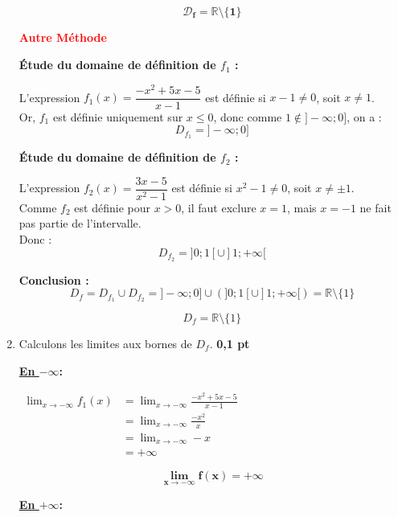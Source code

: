 \documentclass[12pt,a4paper]{article}
\begin{document}
\begin{enumerate}
    \begin{resultbox}
    \[
    \mathbf{\mathcal{D}_f = \mathbb{R} \setminus \{1\}}
    \]
		\end{resultbox}

\textcolor{red}{\textbf{Autre Méthode}}		

    \textbf{Étude du domaine de définition de \( f_1 \) :}

    L'expression \( f_1(x) = \dfrac{-x^2 + 5x - 5}{x - 1} \) est définie si \( x - 1 \neq 0 \), soit \( x \neq 1 \).\\
    Or, \( f_1 \) est définie uniquement sur \( x \leq 0 \), donc comme \( 1 \notin ]-\infty ; 0] \), on a :
    \[
    D_{f_1} = ]-\infty ; 0]
    \]

    \textbf{Étude du domaine de définition de \( f_2 \) :}

    L'expression \( f_2(x) = \dfrac{3x - 5}{x^2 - 1} \) est définie si \( x^2 - 1 \neq 0 \), soit \( x \neq \pm 1 \).\\
    Comme \( f_2 \) est définie pour \( x > 0 \), il faut exclure \( x = 1 \), mais \( x = -1 \) ne fait pas partie de l'intervalle.\\
    Donc :
    \[
    D_{f_2} = ]0 ; 1[ \cup ]1 ; +\infty[
    \]

    \textbf{Conclusion :}
    \[
    D_f = D_{f_1} \cup D_{f_2} = ]-\infty ; 0] \cup \left( ]0 ; 1[ \cup ]1 ; +\infty[ \right) = \mathbb{R} \setminus \{1\}
    \]

    \[
    \boxed{D_f = \mathbb{R} \setminus \{1\}}
    \]
		
		
    \item Calculons les limites aux bornes de \( D_f \). \hfill \textbf{0{,}1 pt}

		\textbf{\underline{En $-\infty$}:} 

		\(
		\begin{aligned}
				\lim_{x\to -\infty}f_{1}(x)&=\lim_{x\to -\infty}\frac{-x^{2}+5x-5}{x-1}\\
																	 &=\lim_{x\to -\infty}\frac{-x^{2}}{x}\\
																	 &=\lim_{x\to -\infty}-x\\
																	 &=+\infty
		\end{aligned}
		\)		

    \begin{resultbox}
    \[
    \mathbf{\lim_{x\to -\infty}f(x) = +\infty}
    \]
		\end{resultbox}		
		
		\textbf{\underline{En $+\infty$}:} 


\end{enumerate}
\end{document}
